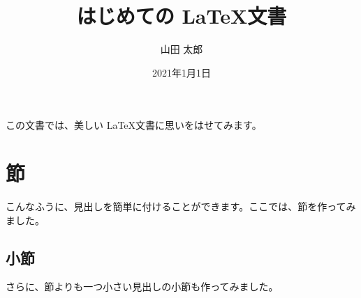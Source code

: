\documentclass{ltjsarticle}
\title{はじめての \LaTeX 文書}
\author{山田 太郎}
\date{2021年1月1日}
\begin{document}
\maketitle
この文書では、美しい \LaTeX 文書に思いをはせてみます。
\section{節}
こんなふうに、見出しを簡単に付けることができます。ここでは、節を作ってみました。
\subsection{小節}
さらに、節よりも一つ小さい見出しの小節も作ってみました。
\end{document}
